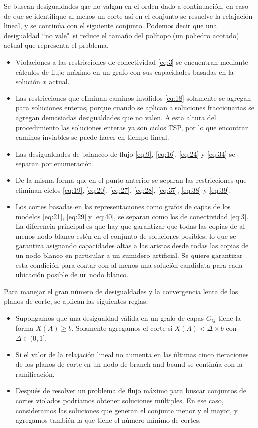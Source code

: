 \documentclass[10pt, a4paper]{article}
\theoremstyle{definition}
\begin{document}
Se buscan desigualdades que no valgan en el orden dado a continuación, en caso de que se identifique al menos un corte así en el conjunto se resuelve la relajación lineal, y se continúa con el siguiente conjunto. Podemos decir que una desigualdad “no vale"\ si reduce el tamaño del polítopo (un poliedro acotado) actual que representa el problema.
\begin{itemize}
	\item Violaciones a las restricciones de conectividad \ref{eq:3} se encuentran mediante cálculos de flujo máximo en un grafo con sus capacidades basadas en la solución $\overline{x}$ actual.
	\item Las restricciones que eliminan caminos inválidos \ref{eq:18} solamente se agregan para soluciones enteras, porque cuando se aplican a soluciones fraccionarias se agregan demasiadas desigualdades que no valen. A esta altura del procedimiento las soluciones enteras ya son ciclos TSP, por lo que encontrar caminos inviables se puede hacer en tiempo lineal.
	\item Las desigualdades de balanceo de flujo \ref{eq:9}, \ref{eq:16}, \ref{eq:24} y \ref{eq:34} se separan por enumeración.
	\item De la misma forma que en el punto anterior se separan las restricciones que eliminan ciclos \ref{eq:19}, \ref{eq:20}, \ref{eq:27}, \ref{eq:28}, \ref{eq:37}, \ref{eq:38} y \ref{eq:39}.
	\item Los cortes basadas en las representaciones como grafos de capas de los modelos \ref{eq:21}, \ref{eq:29} y \ref{eq:40}, se separan como los de conectividad \ref{eq:3}. La diferencia principal es que hay que garantizar que todas las copias de al menos nodo blanco estén en el conjunto de soluciones posibles, lo que se garantiza asignando capacidades altas a las aristas desde todas las copias de un nodo blanco en particular a un sumidero artificial. Se quiere garantizar esta condición para contar con al menos una solución candidata para cada ubicación posible de un nodo blanco. %
\end{itemize}

Para manejar el gran número de desigualdades y la convergencia lenta de los planos de corte, se aplican las siguientes reglas:

\begin{itemize}
	\item Supongamos que una desigualdad válida en un grafo de capas $G_{Q}$ tiene la forma $\overline{X}(A) \geq b$. Solamente agregamos el corte si $\overline{X}(A) < \Delta \times b$ con $\Delta \in (0,1]$.
	\item Si el valor de la relajación lineal no aumenta en las últimas cinco iteraciones de los planos de corte en un nodo de branch and bound se continúa con la ramificación.
	\item Después de resolver un problema de flujo máximo para buscar conjuntos de cortes violados podríamos obtener soluciones múltiples. En ese caso, consideramos las soluciones que generan el conjunto menor y el mayor, y agregamos también la que tiene el número mínimo de cortes.
\end{itemize}
\end{document}
